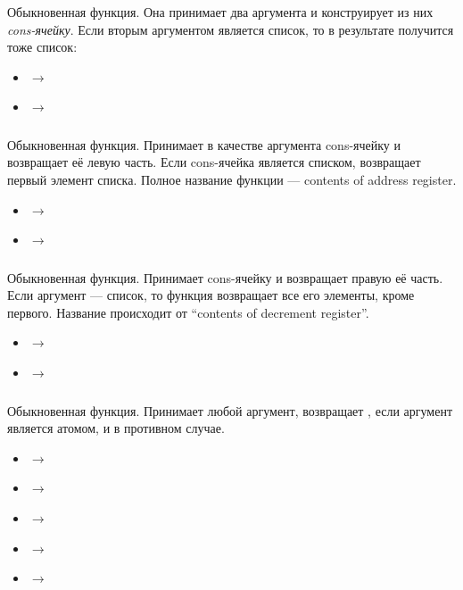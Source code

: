 \documentclass[a4paper, 12pt, titlepage, twoside]{article}
\newenvironment{examples}
               {\begin{itemize}\renewcommand{\labelitemi}{ }}
               {\end{itemize}}
\begin{document}
\subsubsection{}
Обыкновенная функция. Она принимает два аргумента и конструирует из них \textit{cons-ячейку}. Если вторым аргументом  является список, то в результате получится тоже список:
\begin{examples}
  \item {} $\longrightarrow$ 
  \item {} $\longrightarrow$ 
\end{examples}
\subsubsection{}
Обыкновенная функция. Принимает в качестве аргумента cons-ячейку и возвращает её левую часть. Если cons-ячейка является списком, возвращает первый элемент списка. Полное название функции --- contents of address register.
\begin{examples}
\item {} $\longrightarrow$ 
\item {} $\longrightarrow$ 
\end{examples}
\subsubsection{}
Обыкновенная функция. Принимает cons-ячейку и возвращает правую её часть. Если аргумент --- список, то функция возвращает все его элементы, кроме первого. Название происходит от ``contents of decrement register''.
\begin{examples}
\item {} $\longrightarrow$ 
\item {} $\longrightarrow$ 
\end{examples}
\subsubsection{}
Обыкновенная функция. Принимает любой аргумент, возвращает , если аргумент является атомом, и  в противном случае.
\begin{examples}
\item {} $\longrightarrow$ 
\item {} $\longrightarrow$ 
\item {} $\longrightarrow$ 
\item {} $\longrightarrow$ 
\item {} $\longrightarrow$ 
\end{examples}
\end{document}
